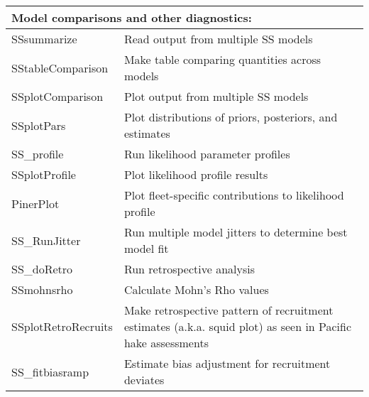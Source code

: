 \begin{center}
\begin{longtable}{p{4.5cm} p{10.52cm}}
		\multicolumn{2}{l}{Model comparisons and other diagnostics:} \Tstrut\Bstrut\\
		\hline
		SSsummarize   \Tstrut & Read output from multiple SS models\\
		SStableComparison \Tstrut & Make table comparing quantities across models\\
		SSplotComparison \Tstrut & Plot output from multiple SS models \\
		SSplotPars    \Tstrut & Plot distributions of priors, posteriors, and estimates \\
		SS\_profile \Tstrut & Run likelihood parameter profiles \\
		SSplotProfile \Tstrut & Plot likelihood profile results \\
		PinerPlot     \Tstrut & Plot fleet-specific contributions to likelihood profile \\
		SS\_RunJitter \Tstrut & Run multiple model jitters to determine best model fit \\
		SS\_doRetro \Tstrut & Run retrospective analysis \\
		SSmohnsrho \Tstrut & Calculate Mohn's Rho values\\
		SSplotRetroRecruits \Tstrut & Make retrospective pattern of recruitment estimates (a.k.a. squid plot) as seen in Pacific hake assessments\Bstrut \\
		SS\_fitbiasramp \Tstrut& Estimate bias adjustment for recruitment deviates \Bstrut\\
		\hline
		

\end{longtable}
\end{center}
